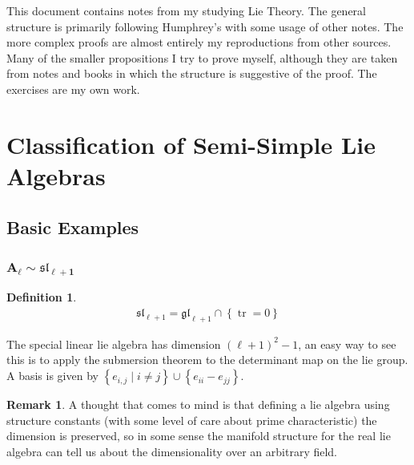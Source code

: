 \documentclass[10.5pt]{article}
\theoremstyle{definition}
\newtheorem{definition}{Definition}
\newtheorem{remark}{Remark}
\numberwithin{example}{subsection}
\numberwithin{proposition}{subsection}
\numberwithin{pb}{subsection}
\newcommand{\set}[1]{\left\{#1\right\}}
\begin{document}
    This document contains notes from my studying Lie Theory. The general structure is primarily following Humphrey's with some usage of other notes. The more complex proofs are almost entirely my reproductions from other sources. Many of the smaller propositions I try to prove myself, although they are taken from notes and books in which the structure is suggestive of the proof. The exercises are my own work.

    \section{Classification of Semi-Simple Lie Algebras}

    \subsection{Basic Examples}

    \subsubsection{\(\mathbf{A_\ell \sim \mathfrak{sl}_{\ell + 1}}\)}
    \begin{definition} \label{defsl}
        \begin{align}
            \mathfrak{sl}_{\ell + 1} = \mathfrak{gl}_{\ell + 1} \cap \set{\operatorname{tr} = 0}
        \end{align}
    \end{definition}

    The special linear lie algebra has dimension \((\ell + 1)^2 - 1\), an easy way to see this is to apply the submersion theorem to the determinant map on the lie group. A basis is given by \(\set{e_{i,j} \mid i \neq j} \cup \set{e_{ii} - e_{jj}}\).

    \begin{remark}
        A thought that comes to mind is that defining a lie algebra using structure constants (with some level of care about prime characteristic) the dimension is preserved, so in some sense the manifold structure for the real lie algebra can tell us about the dimensionality over an arbitrary field.
    \end{remark}
\end{document}
